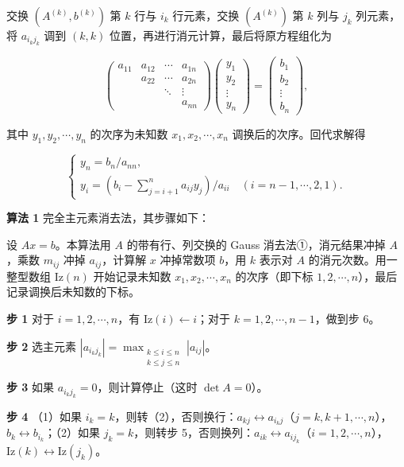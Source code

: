 \documentclass[
  10pt,
  fontset=fandol]{ctexart}
\begin{document}
交换 \((A^{(k)},b^{(k)})\) 第 \(k\) 行与 \(i_k\) 行元素，交换 \((A^{(k)})\) 第 \(k\) 列与 \(j_k\) 列元素，将 \(a_{i_kj_k}\) 调到 \((k,k)\) 位置，再进行消元计算，最后将原方程组化为

\[
\begin{pmatrix}
a_{11}&a_{12}&\cdots&a_{1n}\\
&a_{22}&\cdots&a_{2n}\\
&&\ddots&\vdots\\
&&&a_{nn}
\end{pmatrix}
\begin{pmatrix}y_1\\y_2\\\vdots\\y_n\end{pmatrix}
=\begin{pmatrix}b_1\\b_2\\\vdots\\b_n\end{pmatrix},
\]

其中 \(y_1,y_2,\cdots,y_n\) 的次序为未知数 \(x_1,x_2,\cdots,x_n\) 调换后的次序。回代求解得

\[
\begin{cases}
y_n=b_n/a_{nn},\\
y_i=\displaystyle\left(b_i-\sum_{j=i+1}^{n}a_{ij}y_j\right)/a_{ii}\quad(i=n-1,\cdots,2,1).
\end{cases}
\]

\textbf{算法 1} 完全主元素消去法，其步骤如下：

设 \(Ax=b\)。本算法用 \(A\) 的带有行、列交换的 Gauss 消去法①，消元结果冲掉 \(A\)，乘数 \(m_{ij}\) 冲掉 \(a_{ij}\)，计算解 \(x\) 冲掉常数项 \(b\)，用 \(k\) 表示对 \(A\) 的消元次数。用一整型数组 \(\mathrm{Iz}(n)\) 开始记录未知数 \(x_1,x_2,\cdots,x_n\) 的次序（即下标 \(1,2,\cdots,n\)），最后记录调换后未知数的下标。

\textbf{步 1} 对于 \(i=1,2,\cdots,n\)，有 \(\mathrm{Iz}(i)\leftarrow i\)；对于 \(k=1,2,\cdots,n-1\)，做到步 6。

\textbf{步 2} 选主元素 \(|a_{i_kj_k}|=\max_{\substack{k\le i\le n\\k\le j\le n}}|a_{ij}|\)。

\textbf{步 3} 如果 \(a_{i_kj_k}=0\)，则计算停止（这时 \(\det A=0\)）。

\textbf{步 4} （1）如果 \(i_k=k\)，则转（2），否则换行：\(a_{kj}\leftrightarrow a_{i_kj}\)（\(j=k,k+1,\cdots,n\)），\(b_k\leftrightarrow b_{i_k}\)；（2）如果 \(j_k=k\)，则转步 5，否则换列：\(a_{ik}\leftrightarrow a_{ij_k}\)（\(i=1,2,\cdots,n\)），\(\mathrm{Iz}(k)\leftrightarrow\mathrm{Iz}(j_k)\)。
\end{document}
